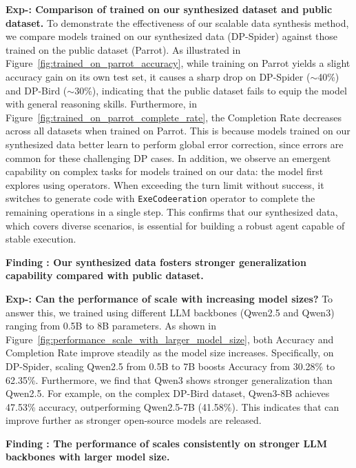 \noindent
\textbf{Exp-\expnum\label{exp:trained_on_synthesized_or_public_data}: Comparison of \syst trained on our synthesized dataset and public dataset.}
To demonstrate the effectiveness of our scalable data synthesis method, we compare models trained on our synthesized data (DP-Spider) against those trained on the public dataset (Parrot). 
As illustrated in Figure~\ref{fig:trained_on_parrot_accuracy}, while training on Parrot yields a slight accuracy gain on its own test set, it causes a sharp drop on DP-Spider ($\sim$40\%) and DP-Bird ($\sim$30\%), indicating that the public dataset fails to equip the model with general reasoning skills. Furthermore, in Figure~\ref{fig:trained_on_parrot_complete_rate}, the Completion Rate decreases across all datasets when trained on Parrot. 
This is because models trained on our synthesized data better learn to perform global error correction, since errors are common for these challenging DP cases. 
In addition, we observe an emergent capability on complex tasks for models trained on our data: the model first explores using operators. When exceeding the turn limit without success, it switches to generate code with \texttt{ExeCodeeration} operator to complete the remaining operations in a single step. 
This confirms that our synthesized data, which covers diverse scenarios, is essential for building a robust agent capable of stable execution.


\begin{shaded}
\noindent
\textbf{Finding \findingnum: Our synthesized data fosters stronger generalization capability compared with public dataset.}
\end{shaded}



\noindent
\textbf{Exp-\expnum\label{exp:perfroamce_scale_on_varisou_model_size}: Can the performance of \syst scale with increasing model sizes?}
To answer this, we trained \syst using different LLM backbones (Qwen2.5 and Qwen3) ranging from 0.5B to 8B parameters. As shown in Figure~\ref{fig:performance_scale_with_larger_model_size}, both Accuracy and Completion Rate improve steadily as the model size increases. Specifically, on DP-Spider, scaling Qwen2.5 from 0.5B to 7B boosts Accuracy from 30.28\% to 62.35\%. Furthermore, we find that Qwen3 shows stronger generalization than Qwen2.5. For example, on the complex DP-Bird dataset, Qwen3-8B achieves 47.53\% accuracy, outperforming Qwen2.5-7B (41.58\%). This indicates that 
\syst can improve further as stronger open-source models are released.

\begin{shaded}
\noindent
\textbf{Finding \findingnum: The performance of \syst scales consistently on stronger LLM backbones with larger model size.}
\end{shaded}